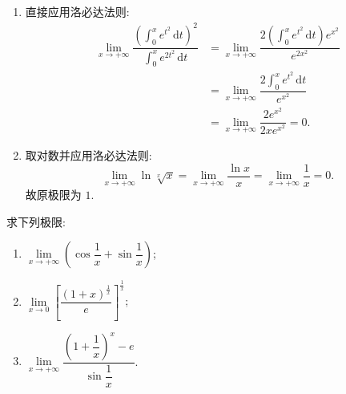 \begin{solution}
\begin{enumerate}
\[\begin{aligned}
                      \dfrac{
                          4\sec^2x\tan x(\tan x-1)+2\sec^4x
                      }{-16\cos4x}
                      =\dfrac{1}{2}.
                  \end{aligned}
              \]
        \item 直接应用洛必达法则:
              \[
                  \begin{aligned}
                      \lim\limits_{x\to+\infty}
                      \dfrac{\displaystyle\left(\int_0^x e^{t^2}\,\mathrm{d}t\right)^2}
                      {\displaystyle\int_0^x e^{2t^2}\,\mathrm{d}t}
                       & =
                      \lim\limits_{x\to+\infty}
                      \dfrac{
                          \displaystyle 2\left(\int_0^x e^{t^2}\,\mathrm{d}t\right)e^{x^2}
                      }{e^{2x^2}}                                                   \\
                       & =
                      \lim\limits_{x\to+\infty}
                      \dfrac{\displaystyle 2\int_0^x e^{t^2}\,\mathrm{d}t}{e^{x^2}} \\
                       & =
                      \lim\limits_{x\to+\infty}
                      \dfrac{2e^{x^2}}{2xe^{x^2}}
                      =0.
                  \end{aligned}
              \]
        \item 取对数并应用洛必达法则:
              \[
                  \displaystyle\lim\limits_{x\to+\infty}\ln\sqrt[x]{x}
                  =
                  \lim\limits_{x\to+\infty}\dfrac{\ln x}{x}
                  =
                  \lim\limits_{x\to+\infty}\dfrac{1}{x}
                  =0.
              \]
              故原极限为 $1$.
    \end{enumerate}
\end{solution}

\begin{example}
    求下列极限:
    \begin{enumerate}
        \item $\displaystyle
                  \lim\limits_{x\to+\infty}\left(\cos\dfrac{1}{x}+\sin\dfrac{1}{x}\right)$;
        \item $\displaystyle
                  \lim\limits_{x\to0}
                  \left[\dfrac{(1+x)^{\frac{1}{x}}}{e}\right]^{\frac{1}{x}}$;
        \item $\displaystyle
                  \lim\limits_{x\to+\infty}
                  \dfrac{\left(1+\dfrac{1}{x}\right)^x-e}{\sin\dfrac{1}{x}}$.
    \end{enumerate}
\end{example}
\exampleblank

